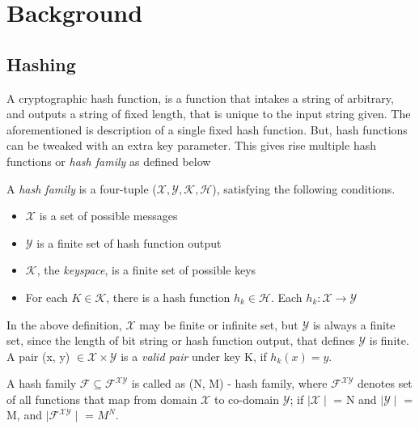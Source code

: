 \chapter{Background}

\section{Hashing}
A cryptographic hash function, is a function that intakes a string of arbitrary, and outputs a string of 
fixed length, that is unique to the input string given. The 
aforementioned is description of a single fixed hash function. But, hash functions can be tweaked
with an extra key parameter. This gives rise multiple hash functions or \emph{hash family} as 
defined below \cite{00005}

\begin{center}
  \framebox
  {
    \parbox{420pt}
    {
      A \emph{hash family} is a four-tuple ($\mathcal{X}, \mathcal{Y}, \mathcal{K}, \mathcal{H}$),
      satisfying the following conditions.
      \begin{itemize}
        \item $\mathcal{X}$ is a set of possible messages
        \item $\mathcal{Y}$ is a finite set of hash function output
        \item $\mathcal{K}$, the \emph{keyspace}, is a finite set of possible keys
        \item For each $K \in \mathcal{K}$, there is a hash function $h_{k} \in \mathcal{H}$. Each 
          $h_{k}: \mathcal{X} \to \mathcal{Y}$ 
      \end{itemize}
    }
  }
\end{center}
\vspace{4mm}

In the above definition, $\mathcal{X}$ may be finite or infinite set, but $\mathcal{Y}$ is always
a finite set, since the length of bit string or hash function output, that defines $\mathcal{Y}$ is
finite. A pair (x, y) $\in \mathcal{X} \times \mathcal{Y}$ is a \emph{valid pair} under key K, if 
$h_{k}(x) = y$.

A hash family $\mathcal{F} \subseteq \mathcal{F}^{\mathcal{XY}}$ is called as (N, M) - hash family, where
$\mathcal{F}^{\mathcal{X}\mathcal{Y}}$ denotes set of all functions that map from domain $\mathcal{X}$
to co-domain $\mathcal{Y}$; if $\mid\mathcal{X}\mid$ = N and $\mid\mathcal{Y}\mid$ = M, and 
$\mid\mathcal{F}^{\mathcal{XY}}\mid$ = $M^{N}$.

